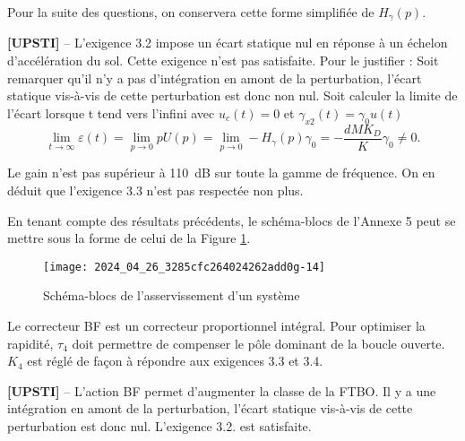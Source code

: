 Pour la suite des questions, on conservera cette forme simplifiée de $H_{\gamma}(p)$.

\ifprof
\begin{corrige}%
\textbf{[UPSTI]} -- 
L’exigence 3.2 impose un écart statique nul en réponse à un échelon d’accélération du sol. Cette exigence n’est pas satisfaite. Pour le justifier :
	Soit remarquer qu’il n’y a pas d’intégration en amont de la perturbation, l’écart statique vis-à-vis de cette perturbation est donc non nul.
	Soit calculer la limite de l’écart lorsque t tend vers l’infini avec $u_c (t)=0$ et $\gamma_{x2} (t)= \gamma_0 u(t)$ 
	$$ \lim_{t\to\infty}  \varepsilon(t) 
	= \lim_{p\to 0}  pU(p) 
	= \lim_{p\to 0}-H_{\gamma} (p) \gamma_0 =-\dfrac{dMK_D}{K} \gamma_0 \neq 0.$$

Le gain n’est pas supérieur à \SI{110}{dB} sur toute la gamme de fréquence. On en déduit que l’exigence 3.3 n’est pas respectée non plus.

\end{corrige}
\else
\fi

\ifprof
\else
En tenant compte des résultats précédents, le schéma-blocs de l'Annexe 5 peut se mettre sous la forme de celui de la Figure \ref{ccmp2023_fig_13}.

\begin{figure}[!h]
\centering
\texttt{[image: 2024\_04\_26\_3285cfc264024262add0g-14]}
\caption{\label{ccmp2023_fig_13}  Schéma-blocs de l'asservissement d'un système}
\end{figure}



Le correcteur BF est un correcteur proportionnel intégral. Pour optimiser la rapidité, $\tau_{4}$ doit permettre de compenser le pôle dominant de la boucle ouverte. $K_{4}$ est réglé de façon à répondre aux exigences 3.3 et 3.4.
\fi

\ifprof
\begin{corrige}%
\textbf{[UPSTI]} -- L’action BF permet d’augmenter la classe de la FTBO. Il y a une intégration en amont de la perturbation, l’écart statique vis-à-vis de cette perturbation est donc nul. L’exigence 3.2. est satisfaite.
\end{corrige}
\else
\fi

